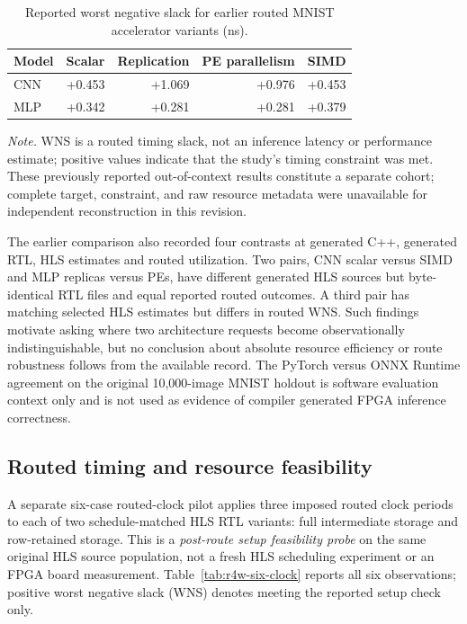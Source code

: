 \documentclass{article}
\newcommand{\tablenote}[1]{\par\vspace{3pt}\begin{minipage}{\linewidth}\footnotesize\emph{Note.} #1\end{minipage}}
\begin{document}
\begin{table}[H]
\centering
\caption{Reported worst negative slack for earlier routed MNIST accelerator variants (ns).}
\label{tab:routed-wns}
\small
\renewcommand{\arraystretch}{1.15}
\setlength{\tabcolsep}{4pt}
\begin{tabularx}{\linewidth}{@{}Xrrrr@{}}
\toprule
Model & Scalar & Replication & PE parallelism & SIMD \\
\midrule
CNN & +0.453 & +1.069 & +0.976 & +0.453 \\
MLP & +0.342 & +0.281 & +0.281 & +0.379 \\
\bottomrule
\end{tabularx}
\tablenote{WNS is a routed timing slack, not an inference latency or performance estimate; positive values indicate that the study's timing constraint was met. These previously reported out-of-context results constitute a separate cohort; complete target, constraint, and raw resource metadata were unavailable for independent reconstruction in this revision.}
\end{table}

The earlier comparison also recorded four contrasts at generated C++, generated RTL, HLS estimates and routed utilization. Two pairs, CNN scalar versus SIMD and MLP replicas versus PEs, have different generated HLS sources but byte-identical RTL files and equal reported routed outcomes. A third pair has matching selected HLS estimates but differs in routed WNS. Such findings motivate asking where two architecture requests become observationally indistinguishable, but no conclusion about absolute resource efficiency or route robustness follows from the available record. The PyTorch versus ONNX Runtime agreement on the original 10,000-image MNIST holdout \cite{lecun1998} is software evaluation context only and is not used as evidence of compiler generated FPGA inference correctness.

\subsection{Routed timing and resource feasibility}
\label{sec:pilot-route}
A separate six-case routed-clock pilot applies three imposed routed clock periods to each of two schedule-matched HLS RTL variants: full intermediate storage and row-retained storage. This is a \emph{post-route setup feasibility probe} on the same original HLS source population, not a fresh HLS scheduling experiment or an FPGA board measurement. Table~\ref{tab:r4w-six-clock} reports all six observations; positive worst negative slack (WNS) denotes meeting the reported setup check only.
\end{document}
